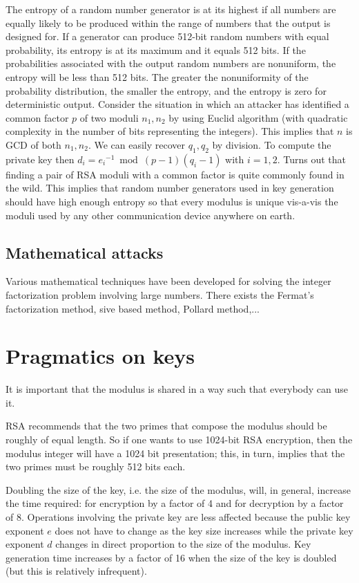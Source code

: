 The entropy of a random number generator is at its highest if all numbers are equally likely to be produced within the range of numbers that the output is designed for. If a generator can produce 512-bit random numbers with equal probability, its entropy is at its maximum and it equals 512 bits.  If the probabilities associated with the output random numbers are nonuniform, the entropy will be less than 512 bits.
The greater the nonuniformity of the probability distribution, the smaller the entropy, and the entropy is zero for deterministic output.
Consider the situation in which an attacker has identified a common factor $p$ of two moduli $n_1,n_2$ by using Euclid algorithm (with quadratic complexity in the number of bits representing the integers). This implies that $n$ is GCD of both $n_1,n_2$. We can easily recover $q_1,q_2$ by division. To compute the private key then $d_i = {e_i}^{-1} \bmod ( p - 1) (q_i - 1)$ with $i=1,2$.
Turns out that finding a pair of RSA moduli with a common factor is quite commonly found in the wild. This implies that random number generators used in key generation should have high enough entropy so that every modulus is unique vis-a-vis the moduli used by any other communication device anywhere on earth.

\subsection{Mathematical attacks}
Various mathematical techniques have been developed for solving the integer factorization problem involving large numbers. There exists the Fermat's factorization method, sive based method, Pollard method,...


\section{Pragmatics on keys}
It is important that the modulus is shared in a way such that everybody can use it.

RSA recommends that the two primes that compose the modulus should be roughly
of equal length. So if one wants to use 1024-bit RSA encryption, then the modulus integer will have a 1024 bit presentation; this, in turn, implies that the two primes must be roughly 512 bits each.

Doubling the size of the key, i.e. the size of the modulus, will, in general, increase the time required: for encryption by a factor of 4 and for decryption by a factor of 8. Operations involving the private key are less affected because the public key exponent $e$ does not have to change as the key size increases while the private key exponent $d$ changes in direct proportion to the size of the modulus. Key generation time increases by a factor of 16 when the size of the key is doubled (but this is relatively infrequent).

